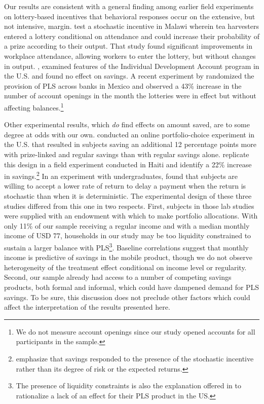 \documentclass[12pt, titlepage]{article}
\begin{document}
		

		Our results are consistent with a general finding among earlier field experiments on lottery-based incentives that behavioral responses occur on the extensive, but not intensive, margin. \textcite{brune_effect_2015} test a stochastic incentive in Malawi wherein tea harvesters entered a lottery conditional on attendance and could increase their probability of a prize according to their output. That study found significant improvements in workplace attendance, allowing workers to enter the lottery, but without changes in output. \textcite{loibl_testing_2016}, examined features of the Individual Development Account program in the U.S. and found no effect on savings. A recent experiment by \textcite{gertler_long-term_2017} randomized the provision of PLS across banks in Mexico and observed a 43\% increase in the number of account openings in the month the lotteries were in effect but without affecting balances.\footnote{We do not measure account openings since our study opened accounts for all participants in the sample.}

		Other experimental results, which \emph{do} find effects on amount saved, are to some degree at odds with our own. \textcite{atalay_savings_2014} conducted an online portfolio-choice experiment in the U.S. that resulted in subjects saving an additional 12 percentage points more with prize-linked and regular savings than with regular savings alone. \textcite{dizon_leveraging_2016} replicate this design in a field experiment conducted in Haiti and identify a 22\% increase in savings.\footnote{\textcite{dizon_leveraging_2016} emphasize that savings responded to the presence of the stochastic incentive rather than its degree of risk or the expected returns.} In an experiment with undergraduates, \textcite{filiz-ozbay_lottery_2015} found that subjects are willing to accept a lower rate of return to delay a payment when the return is stochastic than when it is deterministic. The experimental design of these three studies differed from this one in two respects. First, subjects in those lab studies were supplied with an endowment with which to make portfolio allocations. With only 11\% of our sample receiving a regular income and with a median monthly income of USD 77, households in our study may be too liquidity constrained to sustain a larger balance with PLS\footnote{The presence of liquidity constraints is also the explanation offered in \textcite{loibl_testing_2016} to rationalize a lack of an effect for their PLS product in the US.}. Baseline correlations suggest that monthly income is predictive of savings in the mobile product, though we do not observe heterogeneity of the treatment effect conditional on income level or regularity. Second, our sample already had access to a number of competing savings products, both formal and informal, which could have dampened demand for PLS savings. To be sure, this discussion does not preclude other factors which could affect the interpretation of the results presented here.
\end{document}
